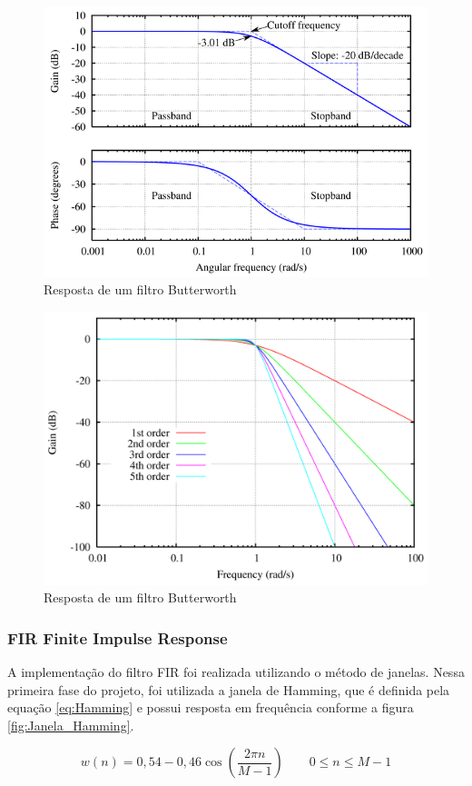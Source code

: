 \begin{figure}[h!]
	\begin{center}
		\includegraphics[width=0.7\linewidth]{images/Butterworth_filter_bode_plot.png}
		\caption{Resposta de um filtro Butterworth}
		\label{fig:Filtro_Butterworth}
	\end{center}
\end{figure}

\begin{figure}[h!]
	\begin{center}
		\includegraphics[width=0.5\linewidth]{images/Butterworth_orders.png}
		\caption{Resposta de um filtro Butterworth}
		\label{fig:Ordem_Filtro_Butterworth}
	\end{center}
\end{figure}

\subsubsection{FIR Finite Impulse Response}

A implementação do filtro FIR foi realizada utilizando o método de janelas. Nessa primeira fase do projeto, foi utilizada a janela de Hamming, que é definida pela equação \ref{eq:Hamming} e possui resposta em frequência conforme a figura \ref{fig:Janela_Hamming}.
 
 
\begin{equation} \label{eq:Hamming}
w(n) = 0,54 - 0,46\cos \left(\dfrac{2\pi n}{M - 1}\right) \qquad 0 \le n \le M-1
\end{equation} 

